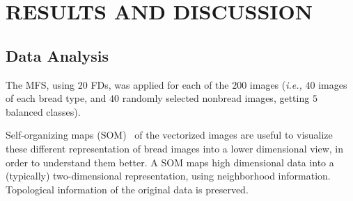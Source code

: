 \documentclass[a4paper,10pt]{article}
\begin{document}
\section{RESULTS AND DISCUSSION}

\subsection{Data Analysis}
The MFS, using $20$ FDs, was applied for each of the $200$ images ({\em i.e.,} $40$ images of each bread type, and $40$ randomly selected nonbread images, getting $5$ balanced classes).

Self-organizing maps (SOM)~\cite{Kohonen2001} of the vectorized images are useful to visualize these different representation of bread images into a lower dimensional view, in order to understand them better. A SOM maps high dimensional data into a (typically) two-dimensional representation, using neighborhood information. Topological information of the original data is preserved.  
\end{document}
